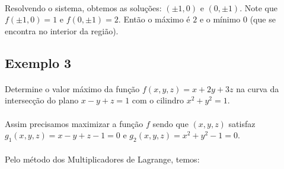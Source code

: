 \documentclass{article}
\begin{document}
            \paragraph{}
            Resolvendo o sistema, obtemos as soluções: $(\pm 1, 0)$ e $(0, \pm 1)$.
            Note que $f(\pm 1, 0) = 1$ e $f(0, \pm 1) = 2$. Então o máximo é $2$ e o mínimo $0$ (que 
            se encontra no interior da região).

        \subsection{Exemplo 3}
            \paragraph{}
            Determine o valor máximo da função $f(x, y, z) = x + 2y + 3z$ na curva da intersecção do plano
            $x - y + z = 1$ com o cilindro $x^2 + y^2 = 1$.
            \paragraph{}
            Assim precisamos maximizar a função $f$ sendo que $(x, y, z)$ satisfaz $g_1(x, y, z) = x - y + z - 1 = 0$ e $g_2(x, y, z) = x^2 + y^2 - 1 = 0$.

            \paragraph{}
            Pelo método dos Multiplicadores de Lagrange, temos:
            
\end{document}
